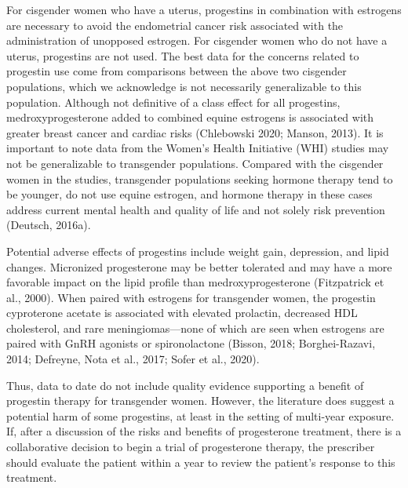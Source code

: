 \documentclass[
]{book}
\begin{document}
For cisgender women who have a uterus, progestins in combination with estrogens are necessary to avoid the endometrial cancer risk
associated with the administration of unopposed
estrogen. For cisgender women who do not have
a uterus, progestins are not used. The best data
for the concerns related to progestin use come
from comparisons between the above two cisgender populations, which we acknowledge is not
necessarily generalizable to this population.
Although not definitive of a class effect for all
progestins, medroxyprogesterone added to
combined equine estrogens is associated with
greater breast cancer and cardiac risks (Chlebowski
2020; Manson, 2013). It is important to note data
from the Women's Health Initiative (WHI) studies
may not be generalizable to transgender populations. Compared with the cisgender women in
the studies, transgender populations seeking hormone therapy tend to be younger, do not use
equine estrogen, and hormone therapy in these
cases address current mental health and quality
of life and not solely risk prevention
(Deutsch, 2016a).

Potential adverse effects of progestins include
weight gain, depression, and lipid changes.
Micronized progesterone may be better tolerated
and may have a more favorable impact on the
lipid profile than medroxyprogesterone (Fitzpatrick
et al., 2000). When paired with estrogens for
transgender women, the progestin cyproterone
acetate is associated with elevated prolactin,
decreased HDL cholesterol, and rare meningiomas---none of which are seen when estrogens are
paired with GnRH agonists or spironolactone
(Bisson, 2018; Borghei-Razavi, 2014; Defreyne,
Nota et al., 2017; Sofer et al., 2020).

Thus, data to date do not include quality evidence supporting a benefit of progestin therapy
for transgender women. However, the literature
does suggest a potential harm of some progestins,
at least in the setting of multi-year exposure. If,
after a discussion of the risks and benefits of progesterone treatment, there is a collaborative decision to begin a trial of progesterone therapy, the
prescriber should evaluate the patient within a year
to review the patient's response to this treatment.
\end{document}
